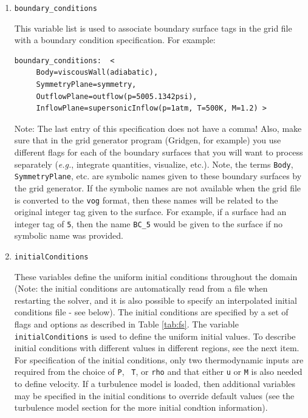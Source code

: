 \documentclass{article}
\begin{document}
\begin{enumerate}
 
\item {\tt boundary\_conditions}

This variable list is used to associate boundary surface tags in 
the grid file with a boundary condition specification.  For example:
\begin{verbatim}
boundary_conditions:  <
     Body=viscousWall(adiabatic),
     SymmetryPlane=symmetry,
     OutflowPlane=outflow(p=5005.1342psi),
     InflowPlane=supersonicInflow(p=1atm, T=500K, M=1.2) >
\end{verbatim}
Note: The last entry of this specification does not have a comma!
Also, make sure that in the grid generator program (Gridgen, for
example) you use different flags for each of the boundary surfaces
that you will want to process separately ({\it e.g.}, integrate
quantities, visualize, etc.).  Note, the terms {\tt Body}, {\tt
  SymmetryPlane}, etc.  are symbolic names given to these boundary
surfaces by the grid generator.  If the symbolic names are not
available when the grid file is converted to the {\tt vog} format,
then these names will be related to the original integer tag given to
the surface.  For example, if a surface had an integer tag of {\tt 5},
then the name {\tt BC\_5} would be given to the surface if no symbolic
name was provided.

\item {\tt initialConditions} 

  These variables define the uniform initial conditions throughout the
  domain (Note: the initial conditions are automatically read from a
  file when restarting the solver, and it is also possible to specify
  an interpolated initial conditions file - see below).  The initial
  conditions are specified by a set of flags and options as described
  in Table \ref{tab:fs}.  The variable {\tt initialConditions} is used
  to define the uniform initial values.  To describe initial
  conditions with different values in different regions, see the next
  item.  For specification of the initial conditions, only two
  thermodynamic inputs are required from the choice of {\tt P}, {\tt
    T}, or {\tt rho} and that either {\tt u} or {\tt M} is also needed
  to define velocity.  If a turbulence model is loaded, then
  additional variables may be specified in the initial conditions to
  override default values (see the turbulence model section for the
  more initial condtion information).

\begin{table}[htbp]


\end{table}
\end{enumerate}
\end{document}
